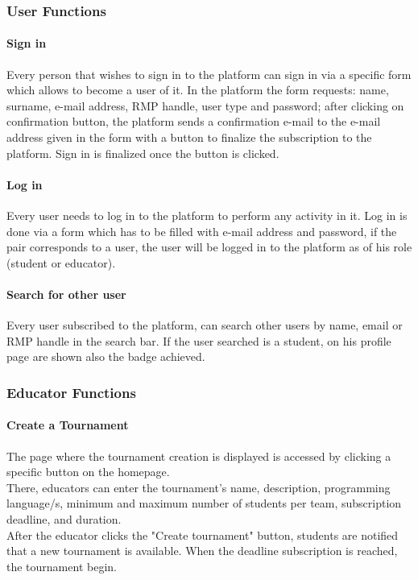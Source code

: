 \subsubsection{User Functions}

\paragraph{Sign in}
Every person that wishes to sign in to the platform can sign in via a specific form which allows to become a user of it.
In the platform the form requests: name, surname, e-mail address, RMP handle, user type and password; after clicking on confirmation button, the platform sends a confirmation e-mail to the e-mail address given in the form with a 
button to finalize the subscription to the platform. Sign in is finalized once the button is clicked.
\paragraph{Log in}
Every user needs to log in to the platform to perform any activity in it. Log in is done via a form which has to be filled with e-mail address and password, if the pair corresponds to a user, the user will be logged in to the 
platform as of his role (student or educator).
\paragraph{Search for other user}
Every user subscribed to the platform, can search other users by name, email or RMP handle in the search bar. If the user searched is a student, on his profile page are shown also the badge achieved.
\subsubsection{Educator Functions}

\paragraph{Create a Tournament}
The page where the tournament creation is displayed is accessed by clicking a specific button on the homepage.\\
There, educators can enter the tournament's name, description, programming language/s, minimum and maximum number of students per team, subscription deadline, and duration.\\ 
After the educator clicks the "Create tournament" button, students are notified that a new tournament is available.
When the deadline subscription is reached, the tournament begin.

